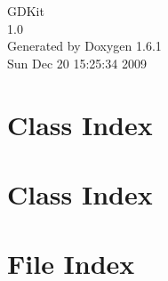 \documentclass[a4paper]{book}
\begin{document}
\hypersetup{pageanchor=false}
\begin{titlepage}
\vspace*{7cm}
\begin{center}
{\Large GDKit \\[1ex]\large 1.0 }\\
\vspace*{1cm}
{\large Generated by Doxygen 1.6.1}\\
\vspace*{0.5cm}
{\small Sun Dec 20 15:25:34 2009}\\
\end{center}
\end{titlepage}
\clearemptydoublepage
{}
\tableofcontents
\clearemptydoublepage
{}
\hypersetup{pageanchor=true}
\chapter{Class Index}

\chapter{Class Index}

\chapter{File Index}

\end{document}
